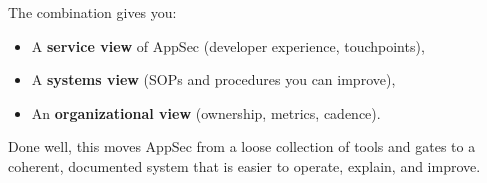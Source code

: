 \documentclass[11pt]{article}
\begin{document}
The combination gives you:

\begin{itemize}
  \item A \textbf{service view} of AppSec (developer experience, touchpoints),
  \item A \textbf{systems view} (SOPs and procedures you can improve),
  \item An \textbf{organizational view} (ownership, metrics, cadence).
\end{itemize}

Done well, this moves AppSec from a loose collection of tools and gates
to a coherent, documented system that is easier to operate, explain,
and improve.
\end{document}
